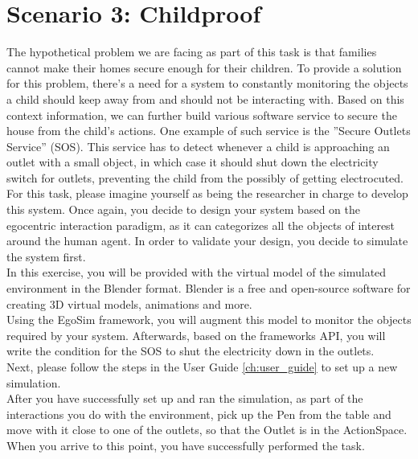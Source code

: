 \section{Scenario 3: Childproof} %
\label{sec:eval_childproof_scenario}
The hypothetical problem we are facing as part of this task is that families cannot make their homes secure enough for their children. To provide a solution for this problem, there's a need for a system to constantly monitoring the objects a child should keep away from and should not be interacting with. Based on this context information, we can further build various software service to secure the house from the child's actions. One example of such service is the ''Secure Outlets Service'' (SOS). This service has to detect whenever a child is approaching an outlet with a small object, in which case it should shut down the electricity switch for outlets, preventing the child from the possibly of getting electrocuted.\\

For this task, please imagine yourself as being the researcher in charge to develop this system. Once again, you decide to design your system based on the egocentric interaction paradigm, as it can categorizes all the objects of interest around the human agent. In order to validate your design, you decide to simulate the system first.\\

In this exercise, you will be provided with the virtual model of the simulated environment in the Blender\cite{blender:online} format. Blender is a free and open-source software for creating 3D virtual models, animations and more.\\

Using the EgoSim framework, you will augment this model to monitor the objects required by your system. Afterwards, based on the frameworks API, you will write the condition for the SOS to shut the electricity down in the outlets.\\

Next, please follow the steps in the User Guide \ref{ch:user_guide} to set up a new simulation.\\

After you have successfully set up and ran the simulation, as part of the interactions you do with the environment, pick up the Pen from the table and move with it close to one of the outlets, so that the Outlet is in the ActionSpace. When you arrive to this point, you have successfully performed the task.
